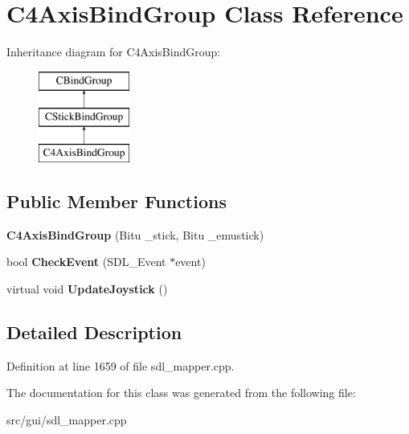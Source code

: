 \hypertarget{classC4AxisBindGroup}{\section{C4\-Axis\-Bind\-Group Class Reference}
\label{classC4AxisBindGroup}
}
Inheritance diagram for C4\-Axis\-Bind\-Group\-:\begin{figure}[H]
\begin{center}
\leavevmode
\includegraphics[height=3.000000cm]{classC4AxisBindGroup}
\end{center}
\end{figure}
\subsection*{Public Member Functions}
\begin{DoxyCompactItemize}
\item 
\hypertarget{classC4AxisBindGroup_a18f535cb78f267a882176039fa912394}{{\bfseries C4\-Axis\-Bind\-Group} (Bitu \-\_\-stick, Bitu \-\_\-emustick)}\label{classC4AxisBindGroup_a18f535cb78f267a882176039fa912394}

\item 
\hypertarget{classC4AxisBindGroup_a895bb30dd9adc0b2a704e30d954b7f5e}{bool {\bfseries Check\-Event} (S\-D\-L\-\_\-\-Event $\ast$event)}\label{classC4AxisBindGroup_a895bb30dd9adc0b2a704e30d954b7f5e}

\item 
\hypertarget{classC4AxisBindGroup_a2de71ed1c0b11f15403f1a63ea7f9169}{virtual void {\bfseries Update\-Joystick} ()}\label{classC4AxisBindGroup_a2de71ed1c0b11f15403f1a63ea7f9169}

\end{DoxyCompactItemize}


\subsection{Detailed Description}


Definition at line 1659 of file sdl\-\_\-mapper.\-cpp.



The documentation for this class was generated from the following file\-:\begin{DoxyCompactItemize}
\item 
src/gui/sdl\-\_\-mapper.\-cpp\end{DoxyCompactItemize}
